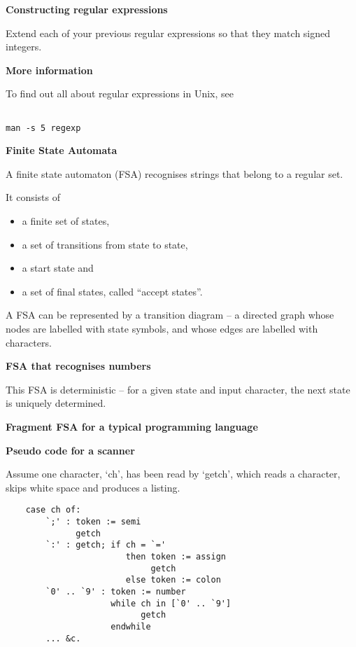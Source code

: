 %
%
\begin{slide}{}
{\bf Constructing regular expressions}

Extend each of your previous regular expressions so that they
match signed integers.

\vfill
\end{slide}
%
%
\begin{slide}{}
{\bf More information}

To find out all about regular expressions in Unix, see
\begin{verbatim}

man -s 5 regexp
\end{verbatim}
\end{slide}

%
%
\begin{slide}{}
{\bf Finite State Automata}

A finite state automaton (FSA) recognises strings
that belong to a regular set.

It consists of
\begin{itemize}
\item a finite set of states,
\item a set of transitions from state to state,
\item a start state and
\item a set of final states, called ``accept states''.
\end{itemize}

A FSA can be represented by a transition diagram -- a
directed graph whose nodes are labelled with state symbols,
and whose edges are labelled with characters.
\end{slide}
%
%
\begin{slide}{}
{\bf FSA that recognises numbers}

\vspace{3ex}

This FSA is deterministic -- for a given state and
input character, the next state is uniquely determined.
\end{slide}
%
%
\begin{slide}{}
{\bf Fragment FSA for a typical programming language}

\vspace{3ex}

\end{slide}
%
%
\begin{slide}{}
{\bf Pseudo code for a scanner}

Assume one character, `ch', has been read by `getch', which
reads a character, skips white space and produces a listing.

\begin{verbatim}
    case ch of:
        `;' : token := semi
              getch
        `:' : getch; if ch = `='
                        then token := assign
                             getch
                        else token := colon
        `0' .. `9' : token := number
                     while ch in [`0' .. `9']
                           getch
                     endwhile
        ... &c.
\end{verbatim}

\end{slide}

